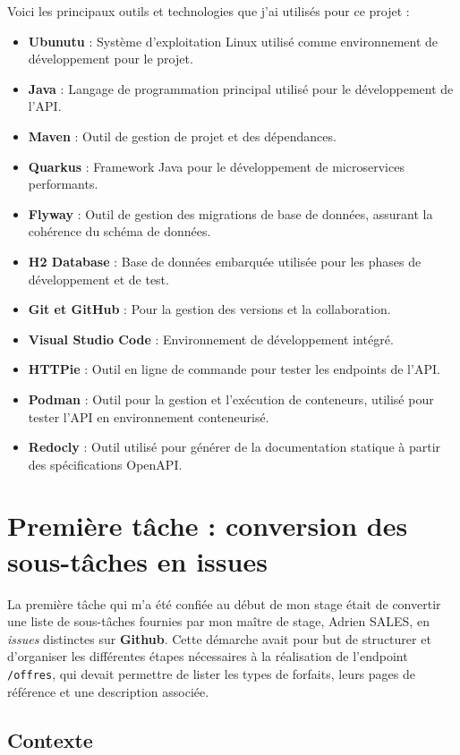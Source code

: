 \documentclass{article}
\begin{document}
	Voici les principaux outils et technologies que j’ai utilisés pour ce projet :
\begin{itemize}
	\item \textbf{Ubunutu} : Système d'exploitation Linux utilisé comme environnement de développement pour le projet.
	\item \textbf{Java} : Langage de programmation principal utilisé pour le développement de l'API.
	\item \textbf{Maven} : Outil de gestion de projet et des dépendances.
	\item \textbf{Quarkus} : Framework Java pour le développement de microservices performants.
	\item \textbf{Flyway} : Outil de gestion des migrations de base de données, assurant la cohérence du schéma de données.
	\item \textbf{H2 Database} : Base de données embarquée utilisée pour les phases de développement et de test.
	\item \textbf{Git et GitHub} : Pour la gestion des versions et la collaboration.
	\item \textbf{Visual Studio Code} : Environnement de développement intégré.
	\item \textbf{HTTPie} : Outil en ligne de commande pour tester les endpoints de l'API.
	\item \textbf{Podman} : Outil pour la gestion et l'exécution de conteneurs, utilisé pour tester l'API en environnement conteneurisé.
	\item \textbf{Redocly} : Outil utilisé pour générer de la documentation statique à partir des spécifications OpenAPI.
\end{itemize}

	
	\section{Première tâche : conversion des sous-tâches en issues}
	
	La première tâche qui m’a été confiée au début de mon stage était de convertir une liste de sous-tâches fournies par mon maître de stage, Adrien SALES, en \textit{issues} distinctes sur \textbf{Github}. Cette démarche avait pour but de structurer et d’organiser les différentes étapes nécessaires à la réalisation de l’endpoint \texttt{/offres}, qui devait permettre de lister les types de forfaits, leurs pages de référence et une description associée.
	
	\subsection{Contexte}
	
\end{document}
